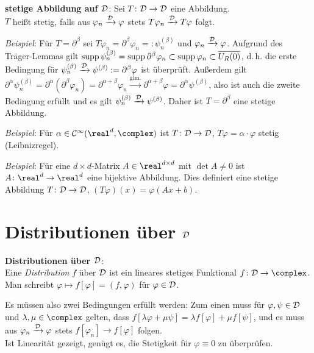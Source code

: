 \linie

\textbf{stetige Abbildung auf $\mathcal{D}$}:
Sei $T\colon \mathcal{D} \rightarrow \mathcal{D}$ eine Abbildung.\\
$T$ heißt stetig, falls aus $\varphi_n \xrightarrow{\mathcal{D}} \varphi$ stets
$T \varphi_n \xrightarrow{\mathcal{D}} T\varphi$ folgt.

\emph{Beispiel}:
Für $T = \partial^\beta$ sei
$T \varphi_n = \partial^\beta \varphi_n =: \psi_n^{(\beta)}$ und
$\varphi_n \xrightarrow{\mathcal{D}} \varphi$.
Aufgrund des Träger-Lemmas gilt
$\operatorname{supp} \psi_n^{(\beta)} = \operatorname{supp} \partial^\beta \varphi_n \subset
\operatorname{supp} \varphi_n \subset \overline{U_R(0)}$,
d.\,h. die erste Bedingung für
$\psi_n^{(\beta)} \xrightarrow{\mathcal{D}} \psi^{(\beta)} := \partial^\beta \varphi$
ist überprüft.
Außerdem gilt $\partial^\alpha \psi_n^{(\beta)} =
\partial^\alpha (\partial^\beta \varphi_n) =
\partial^{\alpha + \beta} \varphi_n \xrightarrow{\text{glm.}}
\partial^{\alpha + \beta} \varphi = \partial^\alpha \psi^{(\beta)}$,
also ist auch die zweite Bedingung erfüllt und es gilt
$\psi_n^{(\beta)} \xrightarrow{\mathcal{D}} \psi^{(\beta)}$.
Daher ist $T = \partial^\beta$ eine stetige Abbildung.

\emph{Beispiel}:
Für $\alpha \in \C^\infty(\real^d, \complex)$ ist
$T\colon \mathcal{D} \rightarrow \mathcal{D}$, $T\varphi = \alpha \cdot \varphi$ stetig
(Leibnizregel).

\emph{Beispiel}:
Für eine $d \times d$-Matrix $A \in \real^{d \times d}$ mit $\det A \not= 0$
ist $A\colon \real^d \rightarrow \real^d$ eine bijektive Abbildung.
Dies definiert eine stetige Abbildung $T\colon \mathcal{D} \rightarrow \mathcal{D}$,
$(T\varphi)(x) = \varphi(Ax + b)$.

\pagebreak

\section{%
    Distributionen über \texorpdfstring{$\mathcal{D}$}{D}%
}

\textbf{Distributionen über $\mathcal{D}$}:\\
Eine \emph{Distribution} $f$ über $\mathcal{D}$ ist ein lineares stetiges Funktional
$f\colon \D \rightarrow \complex$.\\
Man schreibt $\varphi \mapsto f[\varphi] = (f, \varphi)$ für $\varphi \in \mathcal{D}$.

Es müssen also zwei Bedingungen erfüllt werden:
Zum einen muss für $\varphi, \psi \in \mathcal{D}$ und $\lambda, \mu \in \complex$
gelten, dass
$f[\lambda \varphi + \mu \psi] = \lambda f[\varphi] + \mu f[\psi]$,
und es muss aus $\varphi_n \xrightarrow{\mathcal{D}} \varphi$ stets
$f[\varphi_n] \to f[\varphi]$ folgen.\\
Ist Linearität gezeigt, genügt es, die Stetigkeit für $\varphi \equiv 0$
zu überprüfen.

